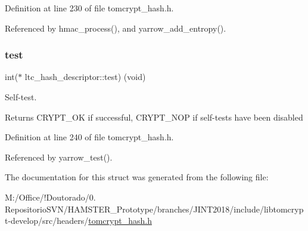 Definition at line 230 of file tomcrypt\+\_\+hash.\+h.



Referenced by hmac\+\_\+process(), and yarrow\+\_\+add\+\_\+entropy().

\mbox{\label{structltc__hash__descriptor_ad31143932c117364e5c69cd7c3d62ef2}} 
\subsubsection{\texorpdfstring{test}{test}}
{\footnotesize\ttfamily int($\ast$ ltc\+\_\+hash\+\_\+descriptor\+::test) (void)}



Self-\/test. 

\begin{DoxyReturn}{Returns}
C\+R\+Y\+P\+T\+\_\+\+OK if successful, C\+R\+Y\+P\+T\+\_\+\+N\+OP if self-\/tests have been disabled 
\end{DoxyReturn}


Definition at line 240 of file tomcrypt\+\_\+hash.\+h.



Referenced by yarrow\+\_\+test().



The documentation for this struct was generated from the following file\+:\begin{DoxyCompactItemize}
\item 
M\+:/\+Office/!\+Doutorado/0. Repositorio\+S\+V\+N/\+H\+A\+M\+S\+T\+E\+R\+\_\+\+Prototype/branches/\+J\+I\+N\+T2018/include/libtomcrypt-\/develop/src/headers/\mbox{\hyperlink{tomcrypt__hash_8h}{tomcrypt\+\_\+hash.\+h}}\end{DoxyCompactItemize}
